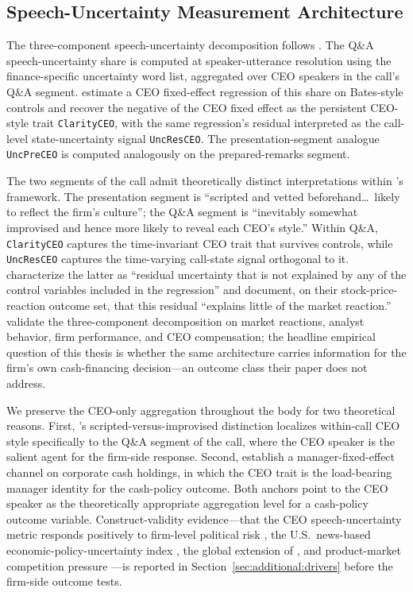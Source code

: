 \subsection{Speech-Uncertainty Measurement Architecture}
\label{sec:framework:measurement}

The three-component speech-uncertainty decomposition follows . The Q\&A speech-uncertainty share is computed at speaker-utterance resolution using the  finance-specific uncertainty word list, aggregated over CEO speakers in the call's Q\&A segment. \citeauthor{dzielinski2021} estimate a CEO fixed-effect regression of this share on Bates-style controls and recover the negative of the CEO fixed effect as the persistent CEO-style trait \texttt{ClarityCEO}, with the same regression's residual interpreted as the call-level state-uncertainty signal \texttt{UncResCEO}. The presentation-segment analogue \texttt{UncPreCEO} is computed analogously on the prepared-remarks segment.

The two segments of the call admit theoretically distinct interpretations within \citeauthor{dzielinski2021}'s framework. The presentation segment is ``scripted and vetted beforehand\dots\ likely to reflect the firm's culture''; the Q\&A segment is ``inevitably somewhat improvised and hence more likely to reveal each CEO's style.'' Within Q\&A, \texttt{ClarityCEO} captures the time-invariant CEO trait that survives controls, while \texttt{UncResCEO} captures the time-varying call-state signal orthogonal to it. \citeauthor{dzielinski2021} characterize the latter as ``residual uncertainty that is not explained by any of the control variables included in the regression'' and document, on their stock-price-reaction outcome set, that this residual ``explains little of the market reaction.'' \citeauthor{dzielinski2021} validate the three-component decomposition on market reactions, analyst behavior, firm performance, and CEO compensation; the headline empirical question of this thesis is whether the same architecture carries information for the firm's own cash-financing decision---an outcome class their paper does not address.

We preserve the CEO-only aggregation throughout the body for two theoretical reasons. First, \citeauthor{dzielinski2021}'s scripted-versus-improvised distinction localizes within-call CEO style specifically to the Q\&A segment of the call, where the CEO speaker is the salient agent for the firm-side response. Second,  establish a manager-fixed-effect channel on corporate cash holdings, in which the CEO trait is the load-bearing manager identity for the cash-policy outcome. Both anchors point to the CEO speaker as the theoretically appropriate aggregation level for a cash-policy outcome variable. Construct-validity evidence---that the CEO speech-uncertainty metric responds positively to firm-level political risk \cite{hassan2020}, the U.S.\ news-based economic-policy-uncertainty index \cite{baker2016}, the global extension of , and product-market competition pressure \cite{hoberg2016}---is reported in Section~\ref{sec:additional:drivers} before the firm-side outcome tests.

